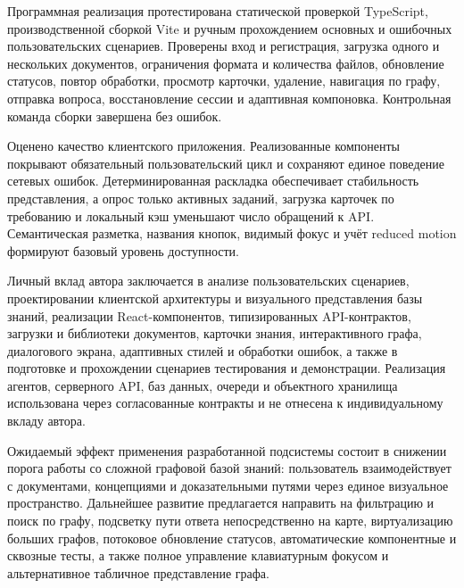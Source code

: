 Программная реализация протестирована статической проверкой TypeScript, производственной сборкой Vite и ручным прохождением основных и ошибочных пользовательских сценариев. Проверены вход и регистрация, загрузка одного и нескольких документов, ограничения формата и количества файлов, обновление статусов, повтор обработки, просмотр карточки, удаление, навигация по графу, отправка вопроса, восстановление сессии и адаптивная компоновка. Контрольная команда сборки завершена без ошибок.

Оценено качество клиентского приложения. Реализованные компоненты покрывают обязательный пользовательский цикл и сохраняют единое поведение сетевых ошибок. Детерминированная раскладка обеспечивает стабильность представления, а опрос только активных заданий, загрузка карточек по требованию и локальный кэш уменьшают число обращений к API. Семантическая разметка, названия кнопок, видимый фокус и учёт reduced motion формируют базовый уровень доступности.

Личный вклад автора заключается в анализе пользовательских сценариев, проектировании клиентской архитектуры и визуального представления базы знаний, реализации React-компонентов, типизированных API-контрактов, загрузки и библиотеки документов, карточки знания, интерактивного графа, диалогового экрана, адаптивных стилей и обработки ошибок, а также в подготовке и прохождении сценариев тестирования и демонстрации. Реализация агентов, серверного API, баз данных, очереди и объектного хранилища использована через согласованные контракты и не отнесена к индивидуальному вкладу автора.

Ожидаемый эффект применения разработанной подсистемы состоит в снижении порога работы со сложной графовой базой знаний: пользователь взаимодействует с документами, концепциями и доказательными путями через единое визуальное пространство. Дальнейшее развитие предлагается направить на фильтрацию и поиск по графу, подсветку пути ответа непосредственно на карте, виртуализацию больших графов, потоковое обновление статусов, автоматические компонентные и сквозные тесты, а также полное управление клавиатурным фокусом и альтернативное табличное представление графа.
